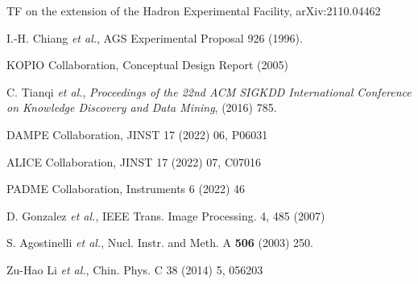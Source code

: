\documentclass[12pt,times,draftclsnofoot,a4paper]{elsarticle}
\begin{document}
\begin{thebibliography}{99}
TF on the extension of the Hadron Experimental Facility, arXiv:2110.04462

I.-H. Chiang {\it et al.}, AGS Experimental Proposal 926 (1996).

KOPIO Collaboration, Conceptual Design Report (2005)

C. Tianqi {\it et al.}, 
{\it Proceedings of the 22nd ACM SIGKDD International Conference on Knowledge Discovery and Data Mining},
(2016) 785.

DAMPE Collaboration, JINST 17 (2022) 06, P06031

ALICE Collaboration, JINST 17 (2022) 07, C07016

PADME Collaboration, Instruments 6 (2022) 46

D. Gonzalez {\it et al.}, IEEE Trans. Image Processing. 4, 485 (2007)

S. Agostinelli {\it et al.},  Nucl. Instr. and Meth. A {\bf 506} (2003) 250.

Zu-Hao Li {\it et al.}, Chin. Phys. C 38 (2014) 5, 056203

\end{thebibliography}
\end{document}
